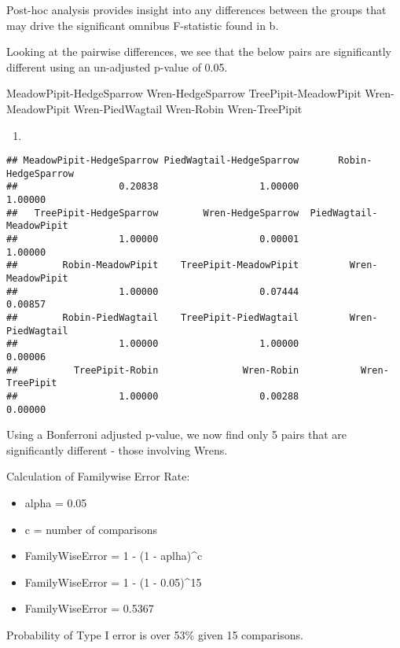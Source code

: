 \documentclass[]{article}
\newenvironment{Shaded}{\begin{snugshade}}{\end{snugshade}}
\newcommand{\KeywordTok}[1]{\textcolor[rgb]{0.13,0.29,0.53}{\textbf{#1}}}
\newcommand{\DataTypeTok}[1]{\textcolor[rgb]{0.13,0.29,0.53}{#1}}
\newcommand{\DecValTok}[1]{\textcolor[rgb]{0.00,0.00,0.81}{#1}}
\newcommand{\FloatTok}[1]{\textcolor[rgb]{0.00,0.00,0.81}{#1}}
\newcommand{\StringTok}[1]{\textcolor[rgb]{0.31,0.60,0.02}{#1}}
\newcommand{\OperatorTok}[1]{\textcolor[rgb]{0.81,0.36,0.00}{\textbf{#1}}}
\newcommand{\NormalTok}[1]{#1}
\providecommand{\tightlist}{%
  \setlength{\itemsep}{0pt}\setlength{\parskip}{0pt}}
\begin{document}
Post-hoc analysis provides insight into any differences between the
groups that may drive the significant omnibus F-statistic found in b.

Looking at the pairwise differences, we see that the below pairs are
significantly different using an un-adjusted p-value of 0.05.

MeadowPipit-HedgeSparrow Wren-HedgeSparrow TreePipit-MeadowPipit
Wren-MeadowPipit Wren-PiedWagtail Wren-Robin Wren-TreePipit

\begin{enumerate}
\def\labelenumi{\alph{enumi}.}
\setcounter{enumi}{3}
\item
\end{enumerate}

\begin{Shaded}
\end{Shaded}

\begin{verbatim}
## MeadowPipit-HedgeSparrow PiedWagtail-HedgeSparrow       Robin-HedgeSparrow 
##                  0.20838                  1.00000                  1.00000 
##   TreePipit-HedgeSparrow        Wren-HedgeSparrow  PiedWagtail-MeadowPipit 
##                  1.00000                  0.00001                  1.00000 
##        Robin-MeadowPipit    TreePipit-MeadowPipit         Wren-MeadowPipit 
##                  1.00000                  0.07444                  0.00857 
##        Robin-PiedWagtail    TreePipit-PiedWagtail         Wren-PiedWagtail 
##                  1.00000                  1.00000                  0.00006 
##          TreePipit-Robin               Wren-Robin           Wren-TreePipit 
##                  1.00000                  0.00288                  0.00000
\end{verbatim}

Using a Bonferroni adjusted p-value, we now find only 5 pairs that are
significantly different - those involving Wrens.

Calculation of Familywise Error Rate:

\begin{itemize}
\tightlist
\item
  alpha = 0.05
\item
  c = number of comparisons
\item
  FamilyWiseError = 1 - (1 - aplha)\^{}c
\item
  FamilyWiseError = 1 - (1 - 0.05)\^{}15
\item
  FamilyWiseError = 0.5367
\end{itemize}

Probability of Type I error is over 53\% given 15 comparisons.
\end{document}
